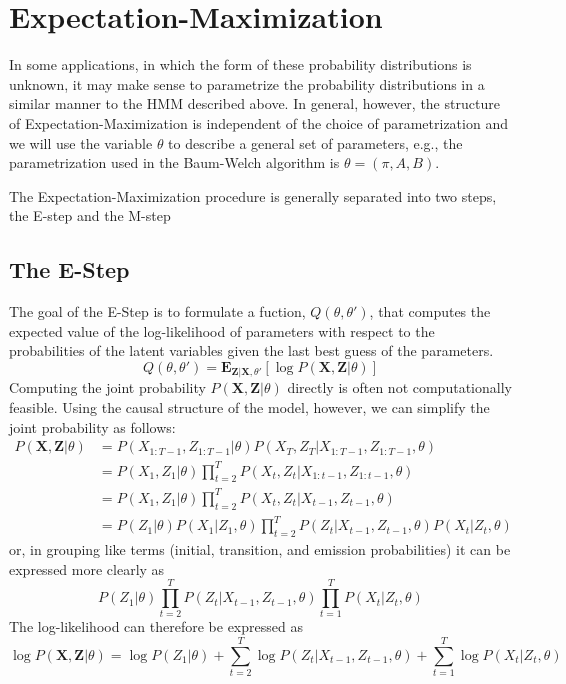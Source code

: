 \documentclass{amsart}
\theoremstyle{definition}
\theoremstyle{remark}
\numberwithin{equation}{section}
\begin{document}
\section{Expectation-Maximization}
In some applications, in which the form of these probability distributions is unknown, it may make sense to parametrize the probability distributions in a similar manner to the HMM described above. In general, however, the structure of Expectation-Maximization is independent of the choice of parametrization and we will use the variable $\theta$ to describe a general set of parameters, e.g., the parametrization used in the Baum-Welch algorithm is $\theta = (\pi,A,B)$.

The Expectation-Maximization procedure is generally separated into two steps, the E-step and the M-step

\subsection*{The E-Step}
The goal of the E-Step is to formulate a fuction, $Q(\theta, \theta')$, that computes the expected value of the log-likelihood of parameters with respect to the probabilities of the latent variables given the last best guess of the parameters.
\[
Q(\theta,\theta') = \textbf{E}_{\textbf{Z}|\textbf{X},\theta'} \left[\log{P(\textbf{X},\textbf{Z}|\theta)}\right]
\]
Computing the joint probability $P(\textbf{X},\textbf{Z}|\theta)$ directly is often not computationally feasible. Using the causal structure of the model, however, we can simplify the joint probability as follows:
\begin{align*}
P(\textbf{X},\textbf{Z}|\theta) &= P(X_{1:T-1},Z_{1:T-1}|\theta)P(X_T,Z_T|X_{1:T-1},Z_{1:T-1},\theta)\\
&= P(X_1,Z_1|\theta)\prod_{t=2}^T P(X_t,Z_t|X_{1:t-1}, Z_{1:t-1},\theta)\\
&= P(X_1,Z_1|\theta)\prod_{t=2}^T P(X_t,Z_t|X_{t-1}, Z_{t-1},\theta)\\
&= P(Z_1|\theta)P(X_1|Z_1,\theta)\prod_{t=2}^T P(Z_t|X_{t-1}, Z_{t-1},\theta) P(X_t|Z_t,\theta)
\end{align*}
or, in grouping like terms (initial, transition, and emission probabilities) it can be expressed more clearly as
\[
P(Z_1|\theta)\prod_{t=2}^T P(Z_t|X_{t-1}, Z_{t-1},\theta) \prod_{t=1}^T P(X_t|Z_t,\theta)
\]
The log-likelihood can therefore be expressed as
\[\log{P(\textbf{X},\textbf{Z}|\theta)} = \log P(Z_1|\theta) + \sum_{t=2}^T \log P(Z_t|X_{t-1}, Z_{t-1},\theta) + \sum_{t=1}^T \log P(X_t|Z_t,\theta)\]
\end{document}
